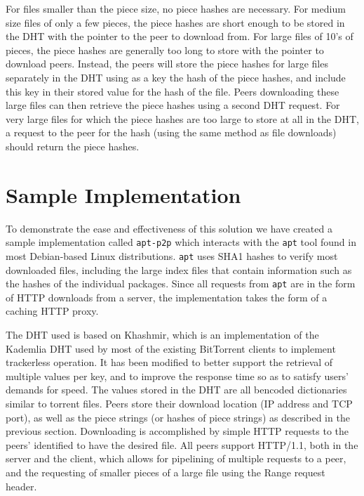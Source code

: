 \documentclass[conference]{IEEEtran}
\begin{document}
For files smaller than the piece size, no piece hashes are
necessary. For medium size files of only a few pieces, the piece
hashes are short enough to be stored in the DHT with the pointer to
the peer to download from. For large files of 10's of pieces, the
piece hashes are generally too long to store with the pointer to
download peers. Instead, the peers will store the piece hashes for
large files separately in the DHT using as a key the hash of the
piece hashes, and include this key in their stored value for the
hash of the file. Peers downloading these large files can then
retrieve the piece hashes using a second DHT request. For very large
files for which the piece hashes are too large to store at all in
the DHT, a request to the peer for the hash (using the same method
as file downloads) should return the piece hashes.

\section{Sample Implementation}

To demonstrate the ease and effectiveness of this solution we have
created a sample implementation called \texttt{apt-p2p} which
interacts with the \texttt{apt} tool found in most Debian-based
Linux distributions. \texttt{apt} uses SHA1 hashes to verify most
downloaded files, including the large index files that contain
information such as the hashes of the individual packages. Since all
requests from \texttt{apt} are in the form of HTTP downloads from a
server, the implementation takes the form of a caching HTTP proxy.

The DHT used is based on Khashmir, which is an implementation of the
Kademlia DHT \cite{kademlia} used by most of the existing BitTorrent
clients to implement trackerless operation. It has been modified to
better support the retrieval of multiple values per key, and to
improve the response time so as to satisfy users' demands for speed.
The values stored in the DHT are all bencoded dictionaries similar
to torrent files. Peers store their download location (IP address
and TCP port), as well as the piece strings (or hashes of piece
strings) as described in the previous section. Downloading is
accomplished by simple HTTP requests to the peers' identified to
have the desired file. All peers support HTTP/1.1, both in the
server and the client, which allows for pipelining of multiple
requests to a peer, and the requesting of smaller pieces of a large
file using the Range request header.
\end{document}
